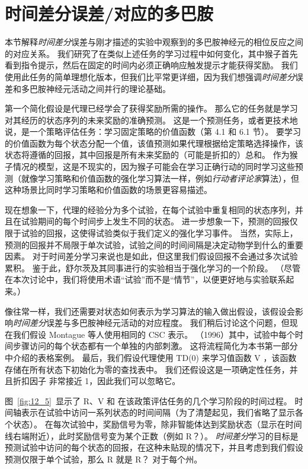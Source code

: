 \section{时间差分误差/对应的多巴胺} \label{sec:td_dopamine}

本节解释\textit{时间差分}误差与刚才描述的实验中观察到的多巴胺神经元的相位反应之间的对应关系。
我们研究了在类似上述任务的学习过程中如何变化，其中猴子首先看到指令提示，然后在固定的时间内必须正确响应触发提示才能获得奖励。
我们使用此任务的简单理想化版本，但我们比平常更详细，因为我们想强调\textit{时间差分}误差和多巴胺神经元活动之间并行的理论基础。


第一个简化假设是代理已经学会了获得奖励所需的操作。
那么它的任务就是学习对其经历的状态序列的未来奖励的准确预测。
这是一个预测任务，或者更技术地说，是一个策略评估任务：学习固定策略的价值函数（第 4.1 和 6.1 节）。
要学习的价值函数为每个状态分配一个值，该值预测如果代理根据给定策略选择操作，该状态将遵循的回报，其中回报是所有未来奖励的（可能是折扣的）总和。
作为猴子情况的模型，这是不现实的，因为猴子可能会在学习正确行动的同时学习这些预测（就像学习策略和价值函数的强化学习算法一样，例如\textit{行动者}\textit{评论家}算法），但这种场景比同时学习策略和价值函数的场景更容易描述。


现在想象一下，代理的经验分为多个试验，在每个试验中重复相同的状态序列，并且在试验期间的每个时间步上发生不同的状态。
进一步想象一下，预测的回报仅限于试验的回报，这使得试验类似于我们定义的强化学习事件。
当然，实际上，预测的回报并不局限于单次试验，试验之间的时间间隔是决定动物学到什么的重要因素。
对于时间差分学习来说也是如此，但这里我们假设回报不会通过多次试验累积。
鉴于此，舒尔茨及其同事进行的实验相当于强化学习的一个阶段。
（尽管在本次讨论中，我们将使用术语“试验”而不是“情节”，以便更好地与实验联系起来。）


像往常一样，我们还需要对状态如何表示为学习算法的输入做出假设，该假设会影响\textit{时间差分}误差与多巴胺神经元活动的对应程度。
我们稍后讨论这个问题，但现在我们假设 Montague 等人使用相同的 CSC 表示。
（1996）其中，试验中每个时间步骤访问的每个状态都有一个单独的内部刺激。
这将流程简化为本书第一部分中介绍的表格案例。
最后，我们假设代理使用 TD(0) 来学习值函数 V ，该函数存储在所有状态下初始化为零的查找表中。
我们还假设这是一项确定性任务，并且折扣因子 非常接近 1，因此我们可以忽略它。


图~\ref{fig:12_5}~显示了 R、V 和 在该政策评估任务的几个学习阶段的时间过程。 
时间轴表示在试验中访问一系列状态的时间间隔（为了清楚起见，我们省略了显示各个状态）。
在每次试验中，奖励信号为零，除非智能体达到奖励状态（显示在时间线右端附近），此时奖励信号变为某个正数（例如 R？）。
\textit{时间差分}学习的目标是预测试验中访问的每个状态的回报，在这种未贴现的情况下，并且考虑到我们假设预测仅限于单个试验，那么 R 就是 R？ 对于每个州。


